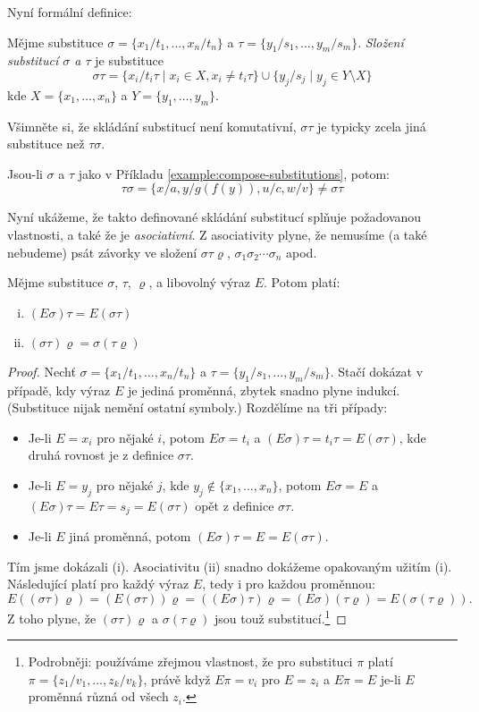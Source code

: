 Nyní formální definice:

\begin{definition}
Mějme substituce $\sigma=\{x_1/t_1,\dots,x_n/t_n\}$ a $\tau=\{y_1/s_1,\dots,y_m/s_m\}$. \emph{Složení substitucí $\sigma$ a $\tau$} je substituce
$$
\sigma\tau=\{x_i/t_i\tau\mid x_i\in X,x_i\neq t_i\tau\}\cup\{y_j/s_j\mid y_j\in Y\setminus X\}
$$
kde $X=\{x_1,\dots,x_n\}$ a $Y=\{y_1,\dots,y_m\}$.
\end{definition}

Všimněte si, že skládání substitucí není komutativní, $\sigma\tau$ je typicky zcela jiná substituce než $\tau\sigma$.

\begin{example}
    Jsou-li $\sigma$ a $\tau$ jako v Příkladu \ref{example:compose-substitutions}, potom: 
    $$
    \tau\sigma=\{x/a,y/g(f(y)),u/c,w/v\}\neq \sigma\tau
    $$
\end{example}

Nyní ukážeme, že takto definované skládání substitucí splňuje požadovanou vlastnosti, a také že je \emph{asociativní}. Z asociativity plyne, že nemusíme (a také nebudeme) psát závorky ve složení $\sigma\tau\varrho$, $\sigma_1\sigma_2\cdots\sigma_n$ apod.

\begin{proposition}
Mějme substituce $\sigma$, $\tau$, $\varrho$, a libovolný výraz $E$. Potom platí:
\begin{enumerate}[(i)]
    \item $(E\sigma)\tau=E(\sigma\tau)$
    \item $(\sigma\tau)\varrho=\sigma(\tau\varrho)$
\end{enumerate}
\end{proposition}

\begin{proof}
Nechť $\sigma=\{x_1/t_1,\dots,x_n/t_n\}$ a $\tau=\{y_1/s_1,\dots,y_m/s_m\}$. Stačí dokázat v případě, kdy výraz $E$ je jediná proměnná, zbytek snadno plyne indukcí. (Substituce nijak nemění ostatní symboly.) Rozdělíme na tři případy:
\begin{itemize}
    \item Je-li $E=x_i$ pro nějaké $i$, potom $E\sigma=t_i$ a $(E\sigma)\tau=t_i\tau=E(\sigma\tau)$, kde druhá rovnost je z definice $\sigma\tau$.
    \item Je-li $E=y_j$ pro nějaké $j$, kde $y_j\notin\{x_1,\dots,x_n\}$, potom $E\sigma=E$ a $(E\sigma)\tau=E\tau=s_j=E(\sigma\tau)$ opět z definice $\sigma\tau$.
    \item Je-li $E$ jiná proměnná, potom $(E\sigma)\tau=E=E(\sigma\tau)$.
\end{itemize}
Tím jsme dokázali (i). Asociativitu (ii) snadno dokážeme opakovaným užitím (i). Následující platí pro každý výraz $E$, tedy i pro každou proměnnou:
$$
E((\sigma\tau)\varrho)=(E(\sigma\tau))\varrho=((E\sigma)\tau)\varrho=(E\sigma)(\tau\varrho)=E(\sigma(\tau\varrho)).
$$
Z toho plyne, že $(\sigma\tau)\varrho$ a $\sigma(\tau\varrho)$ jsou touž substitucí.\footnote{Podrobněji: používáme zřejmou vlastnost, že pro substituci $\pi$ platí $\pi=\{z_1/v_1,\dots,z_k/v_k\}$, právě když $E\pi=v_i$ pro $E=z_i$  a $E\pi=E$ je-li $E$ proměnná různá od všech $z_i$.}
\end{proof}    

